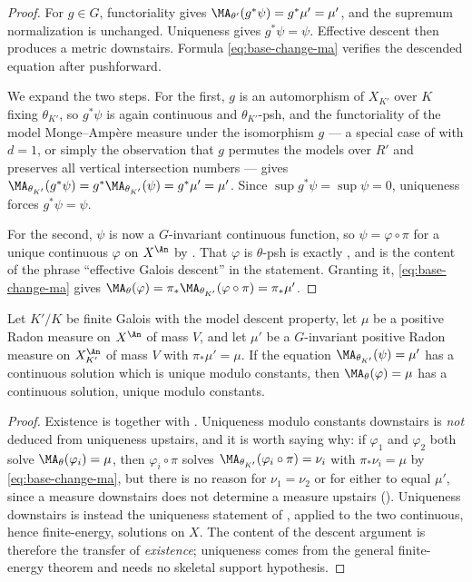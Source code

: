 \begin{proof}
For \(g\in G\), functoriality gives
\(\MA_{\theta'}(g^*\psi)=g^*\mu'=\mu'\), and the supremum normalization is
unchanged.  Uniqueness gives \(g^*\psi=\psi\).  Effective descent then
produces a metric downstairs.  Formula \eqref{eq:base-change-ma} verifies
the descended equation after pushforward.

We expand the two steps.  For the first, \(g\) is an automorphism of
\(X_{K'}\) over \(K\) fixing \(\theta_{K'}\), so \(g^*\psi\) is again
continuous and \(\theta_{K'}\)-psh, and the functoriality of the model
Monge--Amp\`ere measure under the isomorphism \(g\) --- a special case of
 with \(d=1\), or simply the observation that
\(g\) permutes the models over \(R'\) and preserves all vertical
intersection numbers --- gives
\(\MA_{\theta_{K'}}(g^*\psi)=g^*\MA_{\theta_{K'}}(\psi)=g^*\mu'=\mu'\).
Since \(\sup g^*\psi=\sup\psi=0\), uniqueness forces \(g^*\psi=\psi\).

For the second, \(\psi\) is now a \(G\)-invariant continuous function, so
\(\psi=\varphi\circ\pi\) for a unique continuous \(\varphi\) on \(X^{\An}\)
by .  That \(\varphi\) is
\(\theta\)-psh is exactly , and is the
content of the phrase ``effective Galois descent'' in the statement.
Granting it, \eqref{eq:base-change-ma} gives
\(\MA_\theta(\varphi)=\pi_*\MA_{\theta_{K'}}(\varphi\circ\pi)
=\pi_*\mu'\).
\end{proof}

\begin{corollary}
\label{cor:ch30-descent-cy}
Let \(K'/K\) be finite Galois with the model descent property, let \(\mu\)
be a positive Radon measure on \(X^{\An}\) of mass \(V\), and let \(\mu'\)
be a \(G\)-invariant positive Radon measure on \(X_{K'}^{\An}\) of mass
\(V\) with \(\pi_*\mu'=\mu\).  If the equation
\(\MA_{\theta_{K'}}(\psi)=\mu'\) has a continuous solution which is unique
modulo constants, then \(\MA_\theta(\varphi)=\mu\) has a continuous
solution, unique modulo constants.
\end{corollary}

\begin{proof}
Existence is  together with
.  Uniqueness modulo constants downstairs
is \emph{not} deduced from uniqueness upstairs, and it is worth saying why:
if \(\varphi_1\) and \(\varphi_2\) both solve
\(\MA_\theta(\varphi_i)=\mu\), then \(\varphi_i\circ\pi\) solves
\(\MA_{\theta_{K'}}(\varphi_i\circ\pi)=\nu_i\) with
\(\pi_*\nu_i=\mu\) by \eqref{eq:base-change-ma}, but there is no reason for
\(\nu_1=\nu_2\) or for either to equal \(\mu'\), since a measure downstairs
does not determine a measure upstairs
().  Uniqueness downstairs is
instead the uniqueness statement of , applied to
the two continuous, hence finite-energy, solutions on \(X\).  The content
of the descent argument is therefore the transfer of \emph{existence};
uniqueness comes from the general finite-energy theorem and needs no
skeletal support hypothesis.
\end{proof}

